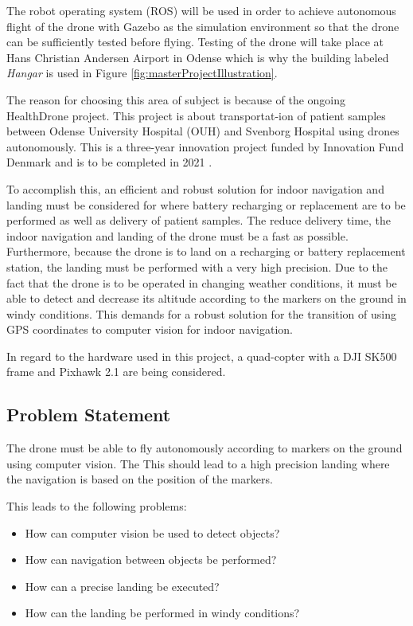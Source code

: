 \documentclass[../Head/Report.tex]{subfiles}
\begin{document}
The robot operating system (ROS) will be used in order to achieve autonomous flight of the drone with Gazebo as the simulation environment so that the drone can be sufficiently tested before flying. Testing of the drone will take place at Hans Christian Andersen Airport in Odense which is why the building labeled \textit{Hangar} is used in Figure \ref{fig:masterProjectIllustration}.   


The reason for choosing this area of subject is because of the ongoing HealthDrone project. This project is about transportat-ion of patient samples between Odense University Hospital (OUH) and Svenborg Hospital using drones autonomously. This is a three-year innovation project funded by Innovation Fund Denmark and is to be completed in 2021 \cite{HealthDrone}. 

To accomplish this, an efficient and robust solution for indoor navigation and landing must be considered for where battery recharging or replacement are to be performed as well as delivery of patient samples. The reduce delivery time, the indoor navigation and landing of the drone must be a fast as possible. Furthermore, because the drone is to land on a recharging or battery replacement station, the landing must be performed with a very high precision. Due to the fact that the drone is to be operated in changing weather conditions, it must be able to detect and decrease its altitude according to the markers on the ground in windy conditions. This demands for a robust solution for the transition of using GPS coordinates to computer vision for indoor navigation.



In regard to the hardware used in this project, a quad-copter with a DJI SK500 frame and Pixhawk 2.1 are being considered.   



\subsection{Problem Statement}

The drone must be able to fly autonomously according to markers on the ground using computer vision. The  This should lead to a high precision landing where the navigation is based on the position of the markers. 

This leads to the following problems:

\begin{itemize}
    \item How can computer vision be used to detect objects?
    \item How can navigation between objects be performed?
    \item How can a precise landing be executed?
    \item How can the landing be performed in windy conditions?
    
\end{itemize} 
\end{document}
